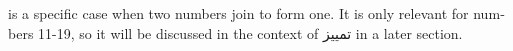 \documentclass[../main.tex]{subfiles}
\begin{document}
\begin{english}
     is a specific case when two numbers join to form one. It is only relevant for numbers 11-19, so it will be discussed in the context of \textarabic{تمييز} in a later section.
\end{english}
\end{document}
